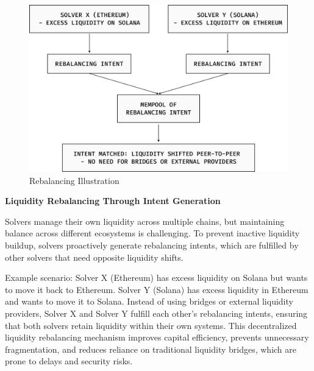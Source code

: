 \begin{figure}[h]
    \centering
    \includegraphics[width=0.9\linewidth]{figure/Rebalancing.png}
    \caption{Rebalancing Illustration}
    \label{fig:rebalancing}
\end{figure}

\textbf{Liquidity Rebalancing Through Intent Generation}

Solvers manage their own liquidity across multiple chains, but maintaining balance across different ecosystems is challenging. To prevent inactive liquidity buildup, solvers proactively generate rebalancing intents, which are fulfilled by other solvers that need opposite liquidity shifts.

Example scenario: Solver X (Ethereum) has excess liquidity on Solana but wants to move it back to Ethereum. Solver Y (Solana) has excess liquidity in Ethereum and wants to move it to Solana.
Instead of using bridges or external liquidity providers, Solver X and Solver Y fulfill each other's rebalancing intents, ensuring that both solvers retain liquidity within their own systems. This decentralized liquidity rebalancing mechanism improves capital efficiency, prevents unnecessary fragmentation, and reduces reliance on traditional liquidity bridges, which are prone to delays and security risks.



